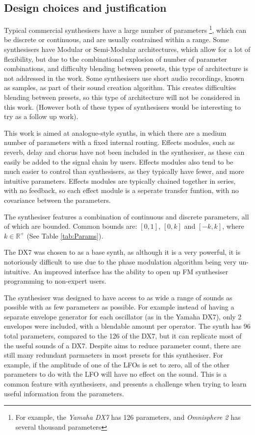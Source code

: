 \documentclass[11pt, oneside]{report}   	%
\begin{document}
\subsection{Design choices and justification}
Typical commercial synthesisers have a large number of parameters \footnote{For example, the \emph{Yamaha DX7} has 126 parameters, and  \emph{Omnisphere 2} has several thousand parameters}, which can be discrete or continuous, and are usually contrained within a range. Some synthesisers have Modular or Semi-Modular architectures, which allow for a lot of flexibility, but due to the combinational explosion of number of parameter combinations, and difficulty blending between presets, this type of architecture is not addressed in the work.
Some synthesisers use short audio recordings, known as samples, as part of their sound creation algorithm. This creates difficulties blending between presets, so this type of architecture will not be considered in this work. (However both of these types of synthesisers would be interesting to try as a follow up work).

This work is aimed at analogue-style synths, in which there are a medium number of parameters with a fixed internal routing. Effects modules, such as reverb, delay and chorus have not been included in the synthesiser, as these can easily be added to the signal chain by users. Effects modules also tend to be much easier to control than synthesisers, as they typically have fewer, and more intuitive parameters. Effects modules are typically chained together in series, with no feedback, so each effect module is a seperate transfer funtion, with no covariance between the parameters.

The synthesiser features a combination of continuous and discrete parameters, all of which are bounded. Common bounds are: $[0, 1]$, $[0, k]$ and $[-k, k]$, where $k \in \mathbb{R}^+ $ (See Table \ref{tab:Params}).

The DX7 was chosen to as a base synth, as although it is a very powerful, it is notoriously difficult to use due to the phase modulation algorithm being very un-intuitive. An improved interface has the ability to open up FM synthesiser programming to non-expert users. %

The synthesiser was designed to have access to as wide a range of sounds as possible with as few parameters as possible. For example instead of having a separate envelope generator for each oscillator (as in the Yamaha DX7), only 2 envelopes were included, with a blendable amount per operator. The synth has 96 total parameters, compared to the 126 of the DX7, but it can replicate most of the useful sounds of a DX7. Despite aims to reduce parameter count, there are still many redundant parmaeters in most presets for this synthesiser. For example, if the amplitude of one of the LFOs is set to zero, all of the other parameters to do with the LFO will have no effect on the sound. This is a common feature with synthesisers, and presents a challenge when trying to learn useful information from the parameters.
\end{document}
